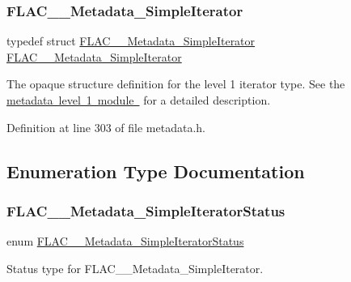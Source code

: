 \subsubsection{\texorpdfstring{FLAC\_\_Metadata\_SimpleIterator}{FLAC\_\_Metadata\_SimpleIterator}}
{\footnotesize\ttfamily typedef struct \mbox{\hyperlink{group__flac__metadata__level1_ga6accccddbb867dfc2eece9ee3ffecb3a}{F\+L\+A\+C\+\_\+\+\_\+\+Metadata\+\_\+\+Simple\+Iterator}} \mbox{\hyperlink{group__flac__metadata__level1_ga6accccddbb867dfc2eece9ee3ffecb3a}{F\+L\+A\+C\+\_\+\+\_\+\+Metadata\+\_\+\+Simple\+Iterator}}}

The opaque structure definition for the level 1 iterator type. See the \mbox{\hyperlink{group__flac__metadata__level1}{metadata level 1 module }} for a detailed description. 

Definition at line 303 of file metadata.\+h.



\subsection{Enumeration Type Documentation}
\mbox{\label{group__flac__metadata__level1_gac926e7d2773a05066115cac9048bbec9}} 
\subsubsection{\texorpdfstring{FLAC\_\_Metadata\_SimpleIteratorStatus}{FLAC\_\_Metadata\_SimpleIteratorStatus}}
{\footnotesize\ttfamily enum \mbox{\hyperlink{group__flac__metadata__level1_gac926e7d2773a05066115cac9048bbec9}{F\+L\+A\+C\+\_\+\+\_\+\+Metadata\+\_\+\+Simple\+Iterator\+Status}}}

Status type for F\+L\+A\+C\+\_\+\+\_\+\+Metadata\+\_\+\+Simple\+Iterator.


